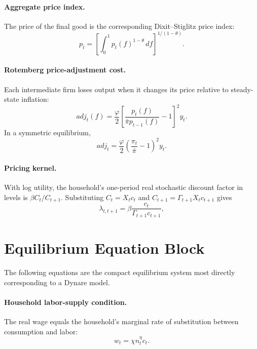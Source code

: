 \documentclass[12pt,final]{article}
\begin{document}
\paragraph{Aggregate price index.}
The price of the final good is the corresponding Dixit--Stiglitz price index:
\begin{equation}
  p_t
  =\left[
    \int_0^1 p_t(f)^{1-\theta}\,df
    \right]^{1/(1-\theta)}.
  \label{eq:price-index}
\end{equation}

\paragraph{Rotemberg price-adjustment cost.}
Each intermediate firm loses output when it changes its price relative to steady-state inflation:
\begin{equation}
  adj_t(f)
  =\frac{\varphi}{2}
  \left[
    \frac{p_t(f)}{\bar\pi p_{t-1}(f)}-1
    \right]^2y_t.
  \label{eq:adjustment-cost-firm}
\end{equation}
In a symmetric equilibrium,
\begin{equation}
  adj_t
  =\frac{\varphi}{2}
  \left(\frac{\pi_t}{\bar\pi}-1\right)^2y_t.
  \label{eq:adjustment-cost}
\end{equation}

\paragraph{Pricing kernel.}
With log utility, the household's one-period real stochastic discount factor in
levels is $\beta C_t/C_{t+1}$.  Substituting $C_t=X_tc_t$ and
$C_{t+1}=\Gamma_{t+1}X_tc_{t+1}$ gives
\begin{equation}
  \lambda_{t,t+1}
  =\beta\frac{c_t}{\Gamma_{t+1}c_{t+1}},
  \label{eq:pricing-kernel-one}
\end{equation}

\section{Equilibrium Equation Block}

The following equations are the compact equilibrium system most directly corresponding to a Dynare model.

\paragraph{Household labor-supply condition.}
The real wage equals the household's marginal rate of substitution between consumption and labor:
\begin{equation}
  w_t=\chi n_t^{\eta}c_t.
  \label{eq:labor-foc}
\end{equation}
\end{document}

